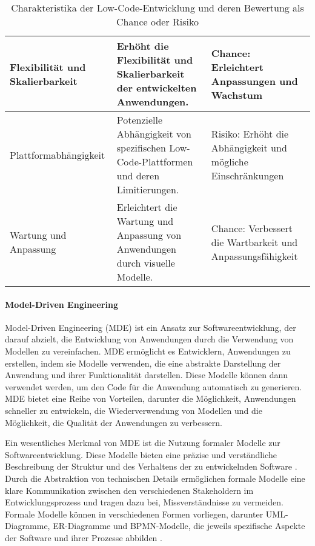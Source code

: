 \begin{table}[h!]
\begin{tabular}{|p{4cm}|p{6cm}|p{4cm}|}
    \hline
    Flexibilität und Skalierbarkeit & Erhöht die Flexibilität und Skalierbarkeit der entwickelten Anwendungen. & Chance: Erleichtert Anpassungen und Wachstum \\
    \hline
    Plattformabhängigkeit & Potenzielle Abhängigkeit von spezifischen Low-Code-Plattformen und deren Limitierungen. & Risiko: Erhöht die Abhängigkeit und mögliche Einschränkungen \\
    \hline
    Wartung und Anpassung & Erleichtert die Wartung und Anpassung von Anwendungen durch visuelle Modelle. & Chance: Verbessert die Wartbarkeit und Anpassungsfähigkeit \\
    \hline
    \end{tabular}
    \caption{Charakteristika der Low-Code-Entwicklung und deren Bewertung als Chance oder Risiko \cite{Bock_2021, Shridhar_2021, Alamin_2021}}
    \label{tab:lowcode_characteristics}
\end{table}
    
\paragraph{Model-Driven Engineering}
Model-Driven Engineering (MDE) ist ein Ansatz zur Softwareentwicklung, der darauf abzielt, die Entwicklung von 
Anwendungen durch die Verwendung von Modellen zu vereinfachen. MDE ermöglicht es Entwicklern, Anwendungen zu erstellen, 
indem sie Modelle verwenden, die eine abstrakte Darstellung der Anwendung und ihrer Funktionalität darstellen. Diese 
Modelle können dann verwendet werden, um den Code für die Anwendung automatisch zu generieren. MDE bietet eine Reihe 
von Vorteilen, darunter die Möglichkeit, Anwendungen schneller zu entwickeln, die Wiederverwendung von Modellen und 
die Möglichkeit, die Qualität der Anwendungen zu verbessern.

Ein wesentliches Merkmal von MDE ist die Nutzung formaler Modelle zur Softwareentwicklung. Diese Modelle bieten 
eine präzise und verständliche Beschreibung der Struktur und des Verhaltens der zu entwickelnden 
Software \cite{Schmidt_2006}. Durch die Abstraktion von technischen Details ermöglichen formale Modelle 
eine klare Kommunikation zwischen den verschiedenen Stakeholdern im Entwicklungsprozess und tragen dazu bei, 
Missverständnisse zu vermeiden. Formale Modelle können in verschiedenen Formen vorliegen, darunter UML-Diagramme, 
ER-Diagramme und BPMN-Modelle, die jeweils spezifische Aspekte der Software und ihrer Prozesse abbilden \cite{Selic_2003}.

